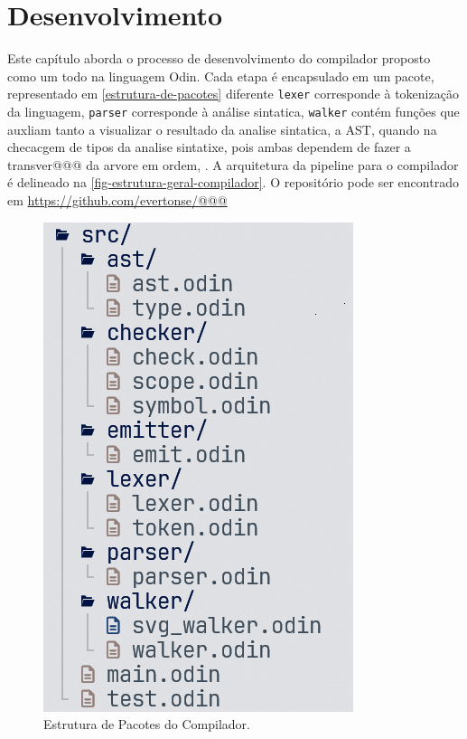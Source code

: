 
\chapter{Desenvolvimento}

Este capítulo aborda o processo de desenvolvimento do compilador proposto como um todo na linguagem Odin.
Cada etapa é encapsulado em um pacote, representado em \autoref{estrutura-de-pacotes} diferente \texttt{lexer} corresponde à tokenização da linguagem, \texttt{parser} corresponde à análise sintatica, \texttt{walker} contém funções que auxliam tanto a visualizar o resultado da analise sintatica, a AST, quando na checacgem de tipos da analise sintatixe, pois ambas dependem de fazer a transver@@@ da arvore em ordem,
\texttt{}. A arquitetura da pipeline para o compilador é delineado na \autoref{fig-estrutura-geral-compilador}.
O repositório pode ser encontrado em \url{https://github.com/evertonse/@@@}

\begin{figure}[H]
  \caption{\label{estrutura-de-pacotes} \small Estrutura de Pacotes do Compilador.}
  \begin{center}
    \includegraphics[scale=0.5]{./Imagens/package-structure.png}
  \end{center}
\end{figure}

